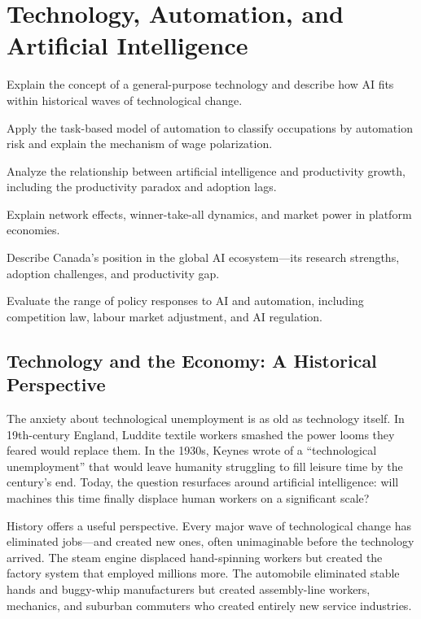 
\chapter{Technology, Automation, and Artificial Intelligence}
\label{ch:technology}

\begin{learningobjectives}
\item Explain the concept of a general-purpose technology and describe how AI fits within historical waves of technological change.
\item Apply the task-based model of automation to classify occupations by automation risk and explain the mechanism of wage polarization.
\item Analyze the relationship between artificial intelligence and productivity growth, including the productivity paradox and adoption lags.
\item Explain network effects, winner-take-all dynamics, and market power in platform economies.
\item Describe Canada's position in the global AI ecosystem---its research strengths, adoption challenges, and productivity gap.
\item Evaluate the range of policy responses to AI and automation, including competition law, labour market adjustment, and AI regulation.
\end{learningobjectives}

\section{Technology and the Economy: A Historical Perspective}

The anxiety about technological unemployment is as old as technology itself. In 19th-century England, Luddite textile workers smashed the power looms they feared would replace them. In the 1930s, Keynes wrote of a ``technological unemployment'' that would leave humanity struggling to fill leisure time by the century's end. Today, the question resurfaces around artificial intelligence: will machines this time finally displace human workers on a significant scale?

History offers a useful perspective. Every major wave of technological change has eliminated jobs---and created new ones, often unimaginable before the technology arrived. The steam engine displaced hand-spinning workers but created the factory system that employed millions more. The automobile eliminated stable hands and buggy-whip manufacturers but created assembly-line workers, mechanics, and suburban commuters who created entirely new service industries.

